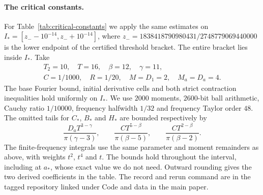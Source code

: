 \paragraph{The critical constants.}
For Table~\ref{tab:critical-constants} we apply the same estimates on
$I_*=[z_--10^{-14},z_-+10^{-14}]$, where
$z_-=1838418790980431/2748779069440000$ is the lower endpoint of the
certified threshold bracket. The entire bracket lies inside $I_*$.
Take
\[
 \begin{gathered}
 T_2=10,\quad T=16,\quad\beta=12,\quad\gamma=11,\\
 C=1/1000,\quad R=1/20,\quad M=D_1=2,\quad M_a=D_a=4.
 \end{gathered}
\]
The base Fourier bound, initial derivative cells and both strict
contraction inequalities hold uniformly on $I_*$. We use $2000$ moments,
$2600$-bit ball arithmetic, Cauchy ratio $1/10000$, frequency halfwidth
$1/32$ and frequency Taylor order $48$.
The omitted tails for $C_*$, $B_*$ and $H_*$ are bounded respectively by
\[
 \frac{D_aT^{3-\gamma}}{\pi(\gamma-3)},\qquad
 \frac{CT^{5-\beta}}{\pi(\beta-5)},\qquad
 \frac{CT^{2-\beta}}{\pi(\beta-2)}.
\]
The finite-frequency integrals use the same parameter and moment
remainders as above, with weights $t^2$, $t^4$ and $t$.
The bounds hold throughout the interval, including at $a_*$,
whose exact value we do not need. Outward rounding gives the
two derived coefficients in the table. The record and rerun command are
in the tagged repository linked under Code and data in the main paper.
